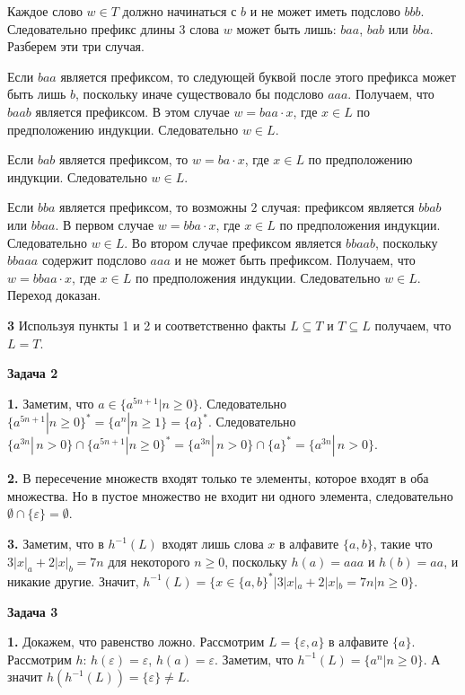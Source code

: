 \documentclass[10pt]{article}
\let\eps\varepsilon
\begin{document}
Каждое слово $w \in T$ должно начинаться с $b$ и не может иметь подслово $bbb$. Следовательно префикс  длины $3$ слова $w$ может быть лишь: $baa$, $bab$ или $bba$. Разберем эти три случая.

Если $baa$ является префиксом, то следующей буквой после этого префикса может быть лишь $b$, поскольку иначе существовало бы подслово $aaa$. Получаем, что $baab$ является префиксом. В этом случае $w = baa  \cdot x$, где $x \in L$ по предположению индукции. Следовательно $w \in L$.

Если $bab$ является префиксом, то $w = ba \cdot x$, где $x \in L$ по предположению индукции. Следовательно $ w \in L$.

Если $bba$ является префиксом, то возможны $2$ случая: префиксом является $bbab$ или $bbaa$. В первом случае $w = bba \cdot x$, где $x \in L$ по предположения индукции. Следовательно $w \in L$. Во втором случае префиксом является $bbaab$, поскольку $bbaaa$ содержит подслово $aaa$ и не может быть префиксом. Получаем, что $w = bbaa \cdot x$, где $x \in L$ по предположения индукции. Следовательно $w \in L$. Переход доказан.

{\bf 3}
Используя пункты 1 и 2 и соответственно факты $L \subseteq T$ и $T \subseteq L$ получаем, что $L = T$.

\medskip

{\bf Задача 2}

{\bf 1.}
Заметим, что $a \in \{ a^{5n+1} | n \geq 0\}$. Следовательно $\{ a^{5n+1} | n \geq 0\}^* = \{ a^{n} | n \geq 1\} = \{ a \}^*$. Следовательно $\{ a^{3n} | \, n>0\} \cap \{ a^{5n+1} | n \geq 0\}^* = \{ a^{3n} | \, n>0\} \cap \{ a \}^* = \{ a^{3n} | \, n>0\}$.

{\bf 2.}
В пересечение множеств входят только те элементы, которое входят в оба множества. Но в пустое множество не входит ни одного элемента, следовательно $\emptyset \cap \{\eps\} = \emptyset$.

{\bf 3.}
Заметим, что в $h^{-1}(L)$ входят лишь слова $x$ в алфавите $\{ a, b \}$, такие что $3 |x|_a + 2 |x|_b = 7n$ для некоторого $n \geq 0$, поскольку $h(a) = aaa$ и $h(b) = aa$, и никакие другие. Значит, $h^{-1}(L) = \{ x \in \{ a, b \}^* | 3 |x|_a + 2 |x|_b = 7n | n \geq 0 \}$.

\medskip

{\bf Задача 3}

{\bf 1.}
Докажем, что равенство ложно. Рассмотрим $L = \{ \eps, a \}$ в алфавите $\{ a \}$. Рассмотрим $h$: $h(\eps) = \eps$, $h(a) = \eps$. Заметим, что $h^{-1}(L) = \{ a^n | n \geq 0 \}$. А значит $h(h^{-1}(L)) = \{ \eps \} \neq L$.
\end{document}
